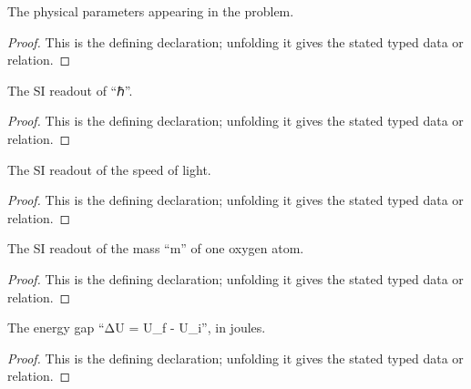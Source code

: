 \begin{definition}[PhotodissociationParameters]
  \label{decl:physics:IPhO_2026_1_C_1:PhotodissociationParameters}
  The physical parameters appearing in the problem.
\end{definition}
\begin{proof}
  This is the defining declaration; unfolding it gives the stated typed data or relation.
\end{proof}

\begin{definition}[reducedPlanckConstantSI]
  \label{decl:physics:IPhO_2026_1_C_1:reducedPlanckConstantSI}
  The SI readout of “ℏ”.
\end{definition}
\begin{proof}
  This is the defining declaration; unfolding it gives the stated typed data or relation.
\end{proof}

\begin{definition}[lightSpeedSI]
  \label{decl:physics:IPhO_2026_1_C_1:lightSpeedSI}
  The SI readout of the speed of light.
\end{definition}
\begin{proof}
  This is the defining declaration; unfolding it gives the stated typed data or relation.
\end{proof}

\begin{definition}[oxygenAtomMassSI]
  \label{decl:physics:IPhO_2026_1_C_1:oxygenAtomMassSI}
  The SI readout of the mass “m” of one oxygen atom.
\end{definition}
\begin{proof}
  This is the defining declaration; unfolding it gives the stated typed data or relation.
\end{proof}

\begin{definition}[energyDifferenceSI]
  \label{decl:physics:IPhO_2026_1_C_1:energyDifferenceSI}
  The energy gap “ΔU = U\_f - U\_i”, in joules.
\end{definition}
\begin{proof}
  This is the defining declaration; unfolding it gives the stated typed data or relation.
\end{proof}

